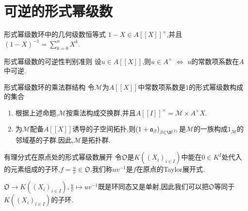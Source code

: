 \section{可逆的形式幂级数}

\begin{proposition}{形式幂级数环中的几何级数恒等式}{}
	$1-X\in A[[X]]^{\times}$,并且$\left(1-X\right)^{-1}=\sum\limits_{k=0}^{n}X^{k}$.
\end{proposition}

\begin{proposition}{形式幂级数的可逆性判别准则}{}
	设$u\in A[[X]]$,则$u\in A^{\times}$ $\iff$ $u$的常数项系数在$A$中可逆.
\end{proposition}

\begin{remark}{形式幂级数环的乘法群结构}{}
	令$\mathscr{M}$为$A[[X]]$中常数项系数是$1$的形式幂级数构成的集合
	\begin{enumerate}
		\item 根据上述命题,$\mathscr{M}$按乘法构成交换群,并且$A[[I]]^{\times}=\mathscr{M}\times A^{\times}X$.
		\item 为$\mathscr{M}$配备$A[[X]]$诱导的子空间拓扑,则$\left(1+\mathfrak{a}_{\beta}\right)_{\beta\in\N^{\left(I\right)}}$是$\mathscr{M}$的一族构成$1_{\mathscr{M}}$的邻域基的子群.因此,$\mathscr{M}$是拓扑群.
	\end{enumerate}
\end{remark}

\begin{theorem}{有理分式在原点处的形式幂级数展开}{}
	令$\mathfrak{O}$是$K((X_{i})_{i\in I})$中能在$0\in K^{I}$处代入的元素组成的子环,$f=\frac{u}{v}\in\mathfrak{O}$.我们称$uv^{-1}$是$f$在原点的Taylor展开式.
\end{theorem}

\begin{remark}{}{}
	$\mathfrak{O}\to K((X_{i})_{i\in I}),\frac{u}{v}\mapsto uv^{-1}$既是环同态又是单射,因此我们可以把$\mathfrak{O}$等同于$K((X_{i})_{i\in I})$的子环.
\end{remark}